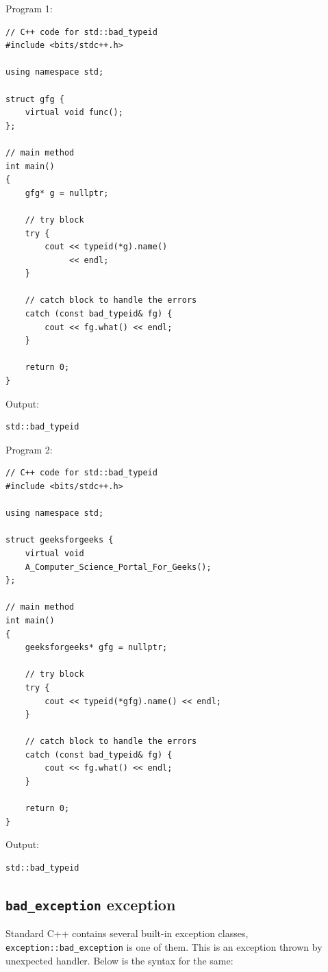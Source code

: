 \documentclass{book}
\begin{document}
Program 1:

\begin{lstlisting}
// C++ code for std::bad_typeid
#include <bits/stdc++.h>
  
using namespace std;
  
struct gfg {
    virtual void func();
};
  
// main method
int main()
{
    gfg* g = nullptr;
  
    // try block
    try {
        cout << typeid(*g).name()
             << endl;
    }
  
    // catch block to handle the errors
    catch (const bad_typeid& fg) {
        cout << fg.what() << endl;
    }
  
    return 0;
}
\end{lstlisting}

Output:

\begin{verbatim}
std::bad_typeid
\end{verbatim}

Program 2:

\begin{lstlisting}
// C++ code for std::bad_typeid
#include <bits/stdc++.h>
  
using namespace std;
  
struct geeksforgeeks {
    virtual void
    A_Computer_Science_Portal_For_Geeks();
};
  
// main method
int main()
{
    geeksforgeeks* gfg = nullptr;
  
    // try block
    try {
        cout << typeid(*gfg).name() << endl;
    }
  
    // catch block to handle the errors
    catch (const bad_typeid& fg) {
        cout << fg.what() << endl;
    }
  
    return 0;
}
\end{lstlisting}

Output:

\begin{verbatim}
std::bad_typeid
\end{verbatim}

\subsection{\texttt{bad\_exception} exception}

Standard C++ contains several built-in exception classes, \texttt{exception::bad\_exception} is one of them. This is an exception thrown by unexpected handler. Below is the syntax for the same:
\end{document}
